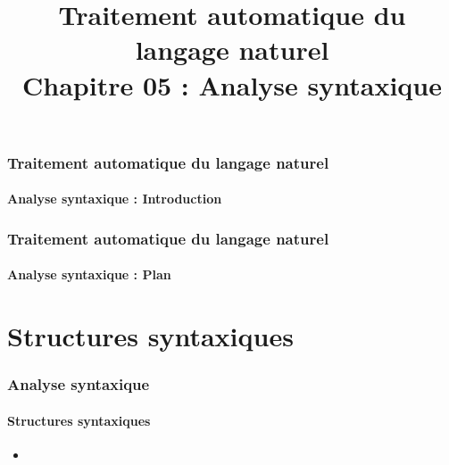 \documentclass[xcolor=table]{beamer}
\title[TALN : 05- Analyse syntaxique]%
{Traitement automatique du langage naturel\\Chapitre 05 : Analyse syntaxique}
\begin{document}
	
\begin{frame}
\frametitle{Traitement automatique du langage naturel}
\framesubtitle{Analyse syntaxique : Introduction}

%		
%

\end{frame}

%
%

\begin{frame}
\frametitle{Traitement automatique du langage naturel}
\framesubtitle{Analyse syntaxique : Plan}

\begin{multicols}{2}
\tableofcontents
\end{multicols}
\end{frame}

\section{Structures syntaxiques}

\begin{frame}
\frametitle{Analyse syntaxique}
\framesubtitle{Structures syntaxiques}

\begin{itemize}
	\item 
\end{itemize}

\end{frame}
\end{document}
